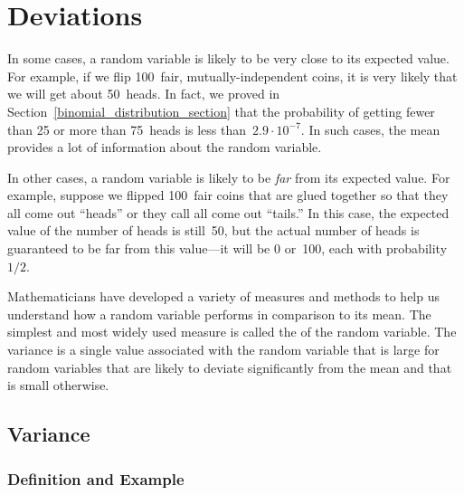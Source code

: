 \chapter{Deviations}\label{chap:deviations}

In some cases, a random variable is likely to be very close to its
expected value.  For example, if we flip 100~fair,
mutually-independent coins, it is very likely that we will get about
50~heads.  In fact, we proved in
Section~\ref{binomial_distribution_section} that the probability of
getting fewer than 25 or more than 75~heads is less than~$2.9 \cdot
10^{-7}$.  In such cases, the mean provides a lot of information about
the random variable.

In other cases, a random variable is likely to be \emph{far} from its
expected value.  For example, suppose we flipped 100~fair coins that
are glued together so that they all come out ``heads'' or they call
all come out ``tails.''  In this case, the expected value of the
number of heads is still~50, but the actual number of heads is
guaranteed to be far from this value---it will be 0 or~100, each with
probability~$1/2$.

Mathematicians have developed a variety of measures and methods to help
us understand how a random variable performs in comparison to its
mean.  The simplest and most widely used measure is called the
 of the random variable.  The variance is a single
value associated with the random variable that is large for random
variables that are likely to deviate significantly from the mean and
that is small otherwise.

\section{Variance}\label{sec:variance}

\subsection{Definition and Example}


